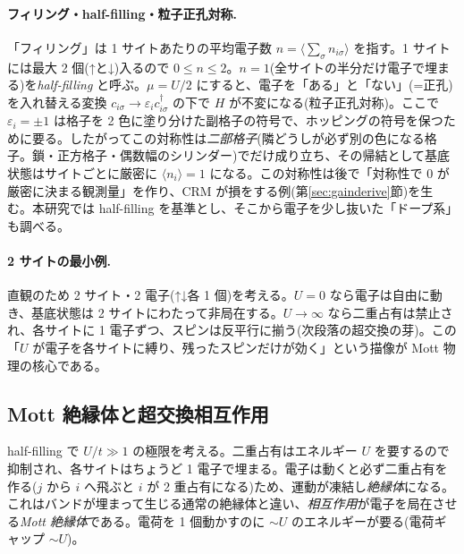 \documentclass[11pt,a4paper]{ltjsarticle}
\newcommand{\ev}[1]{\langle #1\rangle}
\newcommand{\cd}{c^\dagger}
\begin{document}
\paragraph{フィリング・half-filling・粒子正孔対称.}「フィリング」は 1 サイトあたりの平均電子数 $n=\ev{\sum_\sigma n_{i\sigma}}$ を指す。1 サイトには最大 2 個(↑と↓)入るので $0\le n\le2$。$n=1$(全サイトの半分だけ電子で埋まる)を\emph{half-filling} と呼ぶ。$\mu=U/2$ にすると、電子を「ある」と「ない」(=正孔)を入れ替える変換 $c_{i\sigma}\to\varepsilon_i\cd_{i\sigma}$ の下で $H$ が不変になる(粒子正孔対称)。ここで $\varepsilon_i=\pm1$ は格子を 2 色に塗り分けた副格子の符号で、ホッピングの符号を保つために要る。したがってこの対称性は\emph{二部格子}(隣どうしが必ず別の色になる格子。鎖・正方格子・偶数幅のシリンダー)でだけ成り立ち、その帰結として基底状態はサイトごとに厳密に $\ev{n_i}=1$ になる。この対称性は後で「対称性で $0$ が厳密に決まる観測量」を作り、CRM が損をする例(第\ref{sec:gainderive}節)を生む。本研究では half-filling を基準とし、そこから電子を少し抜いた「ドープ系」も調べる。

\paragraph{2 サイトの最小例.}直観のため 2 サイト・2 電子(↑↓各 1 個)を考える。$U=0$ なら電子は自由に動き、基底状態は 2 サイトにわたって非局在する。$U\to\infty$ なら二重占有は禁止され、各サイトに 1 電子ずつ、スピンは反平行に揃う(次段落の超交換の芽)。この「$U$ が電子を各サイトに縛り、残ったスピンだけが効く」という描像が Mott 物理の核心である。

\subsection{Mott 絶縁体と超交換相互作用}
half-filling で $U/t\gg1$ の極限を考える。二重占有はエネルギー $U$ を要するので抑制され、各サイトはちょうど 1 電子で埋まる。電子は動くと必ず二重占有を作る($j$ から $i$ へ飛ぶと $i$ が 2 重占有になる)ため、運動が凍結し\emph{絶縁体}になる。これはバンドが埋まって生じる通常の絶縁体と違い、\emph{相互作用}が電子を局在させる\emph{Mott 絶縁体}である。電荷を 1 個動かすのに $\sim U$ のエネルギーが要る(電荷ギャップ $\sim U$)。
\end{document}

